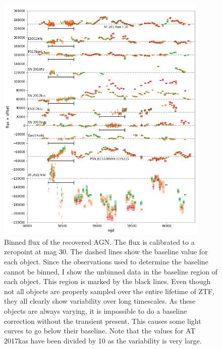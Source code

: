 \documentclass[a4paper,oneside,12pt, class=Latex/Classes/PhDthesisPSnPDF, crop=false]{standalone}
\begin{document}
\begin{figure}
    \centering
    \includegraphics[width=0.9\textwidth]{../Images/chapter_4/non-transients_AGN.png}
    \caption{Binned flux of the recovered AGN. The flux is calibrated to a zeropoint at mag 30. The dashed lines show the baseline value for each object. Since the observations used to determine the baseline cannot be binned, I show the unbinned data in the baseline region of each object. This region is marked by the black lines. Even though not all objects are properly sampled over the entire lifetime of ZTF, they all clearly show variability over long timescales. As these objects are always varying, it is impossible to do a baseline correction without the transient present. This causes some light curves to go below their baseline. Note that the values for AT 2017kas have been divided by 10 as the variability is very large.}
    \label{non-transients_AGN}
\end{figure}
\end{document}
